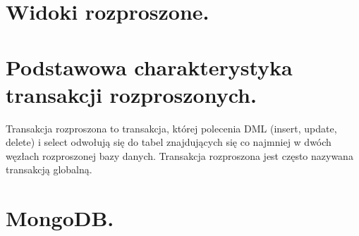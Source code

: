 \documentclass[a4paper]{article}
\begin{document}
    \section{Widoki rozproszone.}

    \section{Podstawowa charakterystyka transakcji rozproszonych.}

    Transakcja rozproszona to transakcja, której polecenia DML (insert, update, delete) i select odwołują się do tabel
    znajdujących się co najmniej w dwóch węzłach rozproszonej bazy danych. Transakcja rozproszona jest często nazywana
    transakcją globalną.


    \section{MongoDB.}
\end{document}
